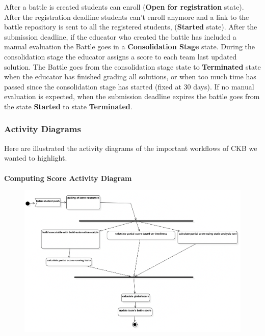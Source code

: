After a battle is created students can enroll (\textbf{Open for registration} state). After the registration deadline students can't enroll anymore and a link to the battle repository is sent to all the registered students, (\textbf{Started} state). After the submission deadline, if the educator who created the battle has included a manual evaluation the Battle goes in a \textbf{Consolidation Stage} state. During the consolidation stage the educator assigns a score to each team last updated solution. The Battle goes from the consolidation stage state to \textbf{Terminated} state when the educator has finished grading all solutions, or when too much time has passed since the consolidation stage has started (fixed at 30 days). If no manual evaluation is expected, when the submission deadline expires the battle goes from the state \textbf{Started} to state \textbf{Terminated}.
\clearpage

\subsubsection{Activity Diagrams}
Here are illustrated the activity diagrams of the important workflows of CKB we wanted to highlight.\\
\\
\textbf{Computing Score Activity Diagram}\\
\begin{figure}[h]
    \clearpage
    \centering
    \includegraphics[width=1\textwidth]{RASD/2Overall_Description/res/newestActDgPush.png}
\end{figure}

